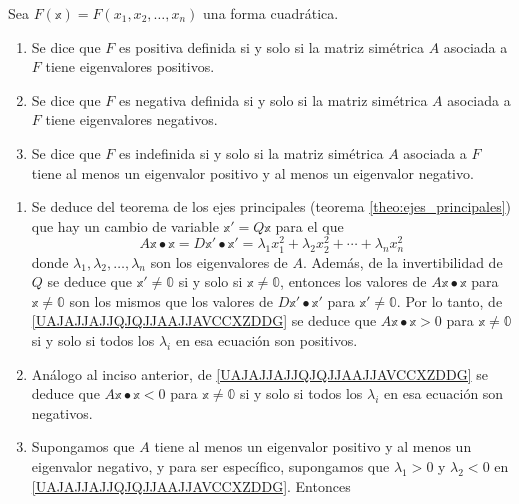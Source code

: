 \begin{theorem}\label{theo:dpdnispsn}
    Sea $F(\mathbb{x})=F\left(x_{1}, x_{2}, \dots, x_{n}\right)$ una forma cuadrática.
    \begin{enumerate}[label=\roman*)]
        \item Se dice que $F$ es positiva definida si y solo si la matriz simétrica $A$ asociada a $F$ tiene eigenvalores positivos.\newpage
        \item Se dice que $F$ es negativa definida si y solo si la matriz simétrica $A$ asociada a $F$ tiene eigenvalores negativos.
        \item Se dice que $F$ es indefinida si y solo si la matriz simétrica $A$ asociada a $F$ tiene al menos un eigenvalor positivo y al menos un eigenvalor negativo.
    \end{enumerate}
    \demostracion
    \begin{enumerate}[label=\roman*)]
        \item Se deduce del teorema de los ejes principales (teorema \ref{theo:ejes_principales}) que hay un cambio de variable $\mathbb{x}' = Q\mathbb{x}$ para el que
        \begin{equation}
            A\mathbb{x} \bullet \mathbb{x} = D\mathbb{x}' \bullet \mathbb{x}' = \lambda_1 x_1^2 + \lambda_2 x_2^2 + \cdots + \lambda_n x_n^2 \label{UAJAJJAJJQJQJJAAJJAVCCXZDDG}
        \end{equation}
        donde $\lambda_1, \lambda_2, \dots, \lambda_n$ son los eigenvalores de $A$. Además, de la invertibilidad de $Q$ se deduce que $\mathbb{x}' \neq \mathbb{0}$ si y solo si $\mathbb{x} \neq \mathbb{0}$, entonces los valores de $A\mathbb{x} \bullet \mathbb{x}$ para $\mathbb{x} \neq \mathbb{0}$ son los mismos que los valores de $D\mathbb{x}' \bullet \mathbb{x}'$ para $\mathbb{x}' \neq \mathbb{0}$. Por lo tanto, de \eqref{UAJAJJAJJQJQJJAAJJAVCCXZDDG} se deduce que $A\mathbb{x} \bullet \mathbb{x} > 0$ para $\mathbb{x} \neq \mathbb{0}$ si y solo si todos los $\lambda_i$ en esa ecuación son positivos.
        \item Análogo al inciso anterior, de \eqref{UAJAJJAJJQJQJJAAJJAVCCXZDDG} se deduce que $A\mathbb{x} \bullet \mathbb{x} < 0$ para $\mathbb{x} \neq \mathbb{0}$ si y solo si todos los $\lambda_i$ en esa ecuación son negativos.
        \item Supongamos que $A$ tiene al menos un eigenvalor positivo y al menos un eigenvalor negativo, y para ser específico, supongamos que $\lambda_1 > 0$ y $\lambda_2 < 0$ en \eqref{UAJAJJAJJQJQJJAAJJAVCCXZDDG}. Entonces

\end{enumerate}
\end{theorem}
